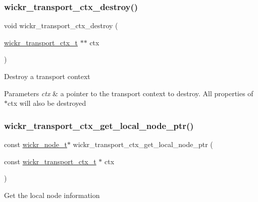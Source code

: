 \subsubsection{\texorpdfstring{wickr\+\_\+transport\+\_\+ctx\+\_\+destroy()}{wickr\_transport\_ctx\_destroy()}}
{\footnotesize\ttfamily void wickr\+\_\+transport\+\_\+ctx\+\_\+destroy (\begin{DoxyParamCaption}\item[{\hyperlink{structwickr__transport__ctx}{wickr\+\_\+transport\+\_\+ctx\+\_\+t} $\ast$$\ast$}]{ctx }\end{DoxyParamCaption})}

Destroy a transport context


\begin{DoxyParams}{Parameters}
{\em ctx} & a pointer to the transport context to destroy. All properties of \textquotesingle{}$\ast$ctx\textquotesingle{} will also be destroyed \\
\hline
\end{DoxyParams}
\mbox{\label{group__wickr__transport__ctx_ga7bcb60a2739744e08cce0c18ce7f01ba}} 
\subsubsection{\texorpdfstring{wickr\+\_\+transport\+\_\+ctx\+\_\+get\+\_\+local\+\_\+node\+\_\+ptr()}{wickr\_transport\_ctx\_get\_local\_node\_ptr()}}
{\footnotesize\ttfamily const \hyperlink{structwickr__node}{wickr\+\_\+node\+\_\+t}$\ast$ wickr\+\_\+transport\+\_\+ctx\+\_\+get\+\_\+local\+\_\+node\+\_\+ptr (\begin{DoxyParamCaption}\item[{const \hyperlink{structwickr__transport__ctx}{wickr\+\_\+transport\+\_\+ctx\+\_\+t} $\ast$}]{ctx }\end{DoxyParamCaption})}

Get the local node information


